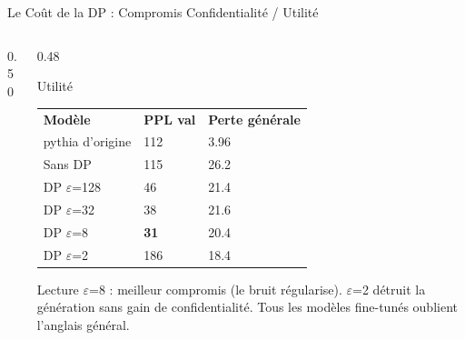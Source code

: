 \begin{frame}{Le Coût de la DP : Compromis Confidentialité / Utilité}
    \begin{columns}[T]
        \begin{column}{0.50\textwidth}
        \end{column}
        \begin{column}{0.48\textwidth}
            \begin{block}{Utilité}
                \renewcommand{\arraystretch}{1.0}
                {\scriptsize
                \begin{tabularx}{\textwidth}{l X X}
                    \rowcolor{TSPblue}\color{white}\textbf{Modèle} & \color{white}\textbf{PPL val} & \color{white}\textbf{Perte générale} \\
                    pythia d'origine & 112 & 3.96 \\
                    \rowcolor{TSPgrey} Sans DP & 115 & 26.2 \\
                    DP $\varepsilon$=128 & 46 & 21.4 \\
                    \rowcolor{TSPgrey} DP $\varepsilon$=32 & 38 & 21.6 \\
                    DP $\varepsilon$=8 & \textbf{31} & 20.4 \\
                    \rowcolor{TSPgrey} DP $\varepsilon$=2 & 186 & 18.4 \\
                \end{tabularx}
                }
            \end{block}
            \begin{alertblock}{Lecture}
                \scriptsize $\varepsilon$=8 : meilleur compromis (le bruit régularise). $\varepsilon$=2 détruit la génération sans gain de confidentialité. Tous les modèles fine-tunés oublient l'anglais général.
            \end{alertblock}
        \end{column}
    \end{columns}
\end{frame}

